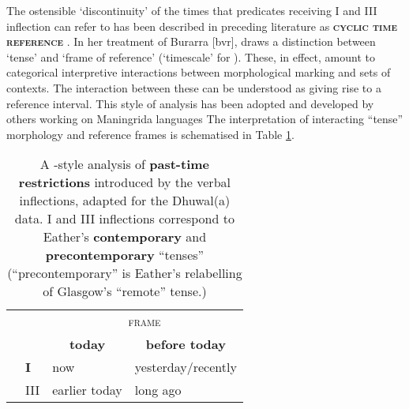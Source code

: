 The ostensible `discontinuity' of the times that predicates receiving \gls{I} and \gls{III} inflection can refer to has been described in preceding literature as \textbf{\textsc{cyclic time reference}} \citep[88]{Comrie1983}. In her treatment of Burarra [\gls{bvr}], \citet{Glasgow1964} draws a distinction between `tense' and `frame of reference' (`timescale' for \citealt[48]{Green1987}). These, in effect, amount to categorical interpretive interactions between morphological marking and sets of contexts. The interaction between these can be understood as giving rise to a reference interval. This style of analysis has been adopted and developed by others working on Maningrida languages \citetext{\citealt[165]{Eather2011} for Nakkara [\gls{nck}], \citet{Green1995} for Gurr-goni [\gls{gge}] and \citet{McKay2000} for Ndjébanna [\gls{djj}].} The interpretation of interacting ``tense'' morphology and reference frames is schematised in Table \ref{GlaswegianTR}. 



\begin{table}[h]\centering\onehalfspacing
		\caption{A \citealt{Glasgow1964}-style analysis of \textbf{past-time restrictions} introduced by the verbal inflections, adapted for the Dhuwal(a) data. \gls{I} and \gls{III} inflections correspond to Eather's \textbf{contemporary} and \textbf{precontemporary} ``tenses'' (``precontemporary'' is Eather's \citeyearpar[166]{Eather2011} relabelling of Glasgow's ``remote'' tense.)}\label{GlaswegianTR}
	\begin{tabular}{@{}llll@{}}\toprule
		
		&                 & \multicolumn{2}{c}{\textsc{frame}}          \\ 
		&                 & \multicolumn{1}{c}{\textbf{today}}         & \multicolumn{1}{c}{\textbf{before today}}      \\\midrule
		\multirow{2}{*}{\textsc{\rotatebox[origin=c]{90}{infl}}} & \textbf{\phantom{\gls{I}}\gls{I}}    & now           & yesterday/recently \\
		& \gls{III} & earlier today & long ago           \\ \bottomrule%
	\end{tabular}
\end{table}


